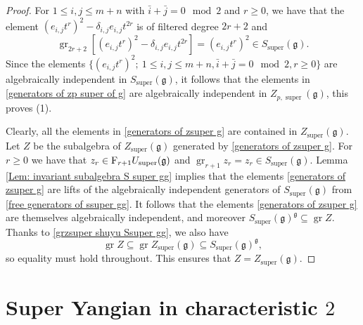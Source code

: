 \documentclass[12pt,reqno]{amsart}
\newcommand{\fg}{\mathfrak{g}}
\DeclareMathOperator{\super}{super}
\DeclareMathOperator{\gr}{gr}
\numberwithin{equation}{section}
\theoremstyle{Theorem}
\theoremstyle{remark}
\numberwithin{equation}{section}
\begin{document}
\begin{proof}
For $1\leq i,j\leq m+n$ with $\bar i+\bar j=0\!\!\!\mod 2$ and $r\geq 0$,
we have that the element $(e_{i,j}t^r)^2-\delta_{i,j}e_{i,j}t^{2r}$ is of filtered degree $2r+2$
and 
\[
\gr_{2r+2}[(e_{i,j}t^r)^2-\delta_{i,j}e_{i,j}t^{2r}]=(e_{i,j}t^r)^2\in S_{\super}(\fg).
\]
Since the elements $\{(e_{i,j}t^r)^2;~1\leq i,j\leq m+n, \bar i+\bar j=0 \!\!\! \mod 2, r\geq 0\}$ are algebraically independent in $S_{\super}(\fg)$,
it follows that the elements in \eqref{generators of zp super of g} are algebraically independent in $Z_{p,\super}(\fg)$, this proves (1).

Clearly, all the elements in \eqref{generators of zsuper g} are contained in $Z_{\super}(\fg)$.
Let $Z$ be the subalgebra of $Z_{\super}(\fg)$ generated by \eqref{generators of zsuper g}.
For $r\geq 0$ we have that $z_r\in{\rm F}_{r+1}U_{\super}(\fg)$ and $\gr_{r+1}z_r=z_r\in S_{\super}(\fg)$.
Lemma \ref{Lem: invariant subalgebra S super gg} implies that the elements \eqref{generators of zsuper g} are lifts of the algebraically independent generators of $S_{\super}(\fg)$ from \eqref{free generators of ssuper gg}.
It follows that the elements \eqref{generators of zsuper g} are themselves algebraically independent, and moreover $S_{\super}(\fg)^{\fg}\subseteq \gr Z$.
Thanks to \eqref{grzsuper shuyu Ssuper gg},
we also have
\[
\gr Z\subseteq \gr Z_{\super}(\fg)\subseteq S_{\super}(\fg)^{\fg},
\]
so equality must hold throughout.
This ensures that $Z=Z_{\super}(\fg)$.
\end{proof}
\section{Super Yangian in characteristic $2$}\label{section:super Yangian}
\end{document}
